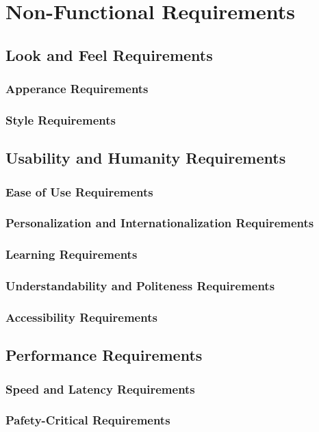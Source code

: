 \documentclass{article}
\begin{document}
\section{Non-Functional Requirements}

\subsection{Look and Feel Requirements}
\subsubsection{Apperance Requirements}
\subsubsection{Style Requirements}

\subsection{Usability and Humanity Requirements}
\subsubsection{Ease of Use Requirements}
\subsubsection{Personalization and Internationalization Requirements}
\subsubsection{Learning Requirements}
\subsubsection{Understandability and Politeness Requirements}
\subsubsection{Accessibility Requirements}

\subsection{Performance Requirements}
\subsubsection{Speed and Latency Requirements}
\subsubsection{Pafety-Critical Requirements}
\end{document}
